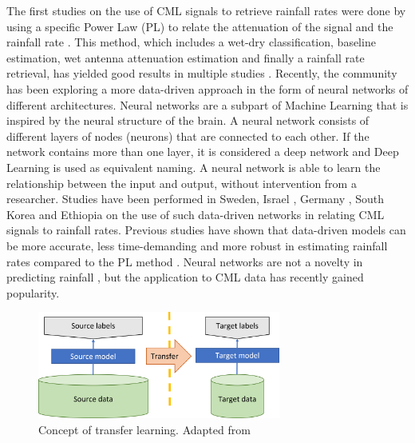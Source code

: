 \documentclass[twocolumn, 10pt, a4paper]{memoir}
\begin{document}
The first studies on the use of CML signals to retrieve rainfall rates were done by using a specific Power Law (PL) to relate the attenuation of the signal and the rainfall rate . This method, which includes a wet-dry classification, baseline estimation, wet antenna attenuation estimation and finally a rainfall rate retrieval, has yielded good results in multiple studies . Recently, the community has been exploring a more data-driven approach in the form of neural networks of different architectures. Neural networks are a subpart of Machine Learning that is inspired by the neural structure of the brain. A neural network consists of different layers of nodes (neurons) that are connected to each other. If the network contains more than one layer, it is considered a deep network and Deep Learning is used as equivalent naming. A neural network is able to learn the relationship between the input and output, without intervention from a researcher. Studies have been performed in Sweden, Israel , Germany , South Korea and Ethiopia \cite{Diba2021} on the use of such data-driven networks in relating CML signals to rainfall rates. Previous studies have shown that data-driven models can be more accurate, less time-demanding and more robust in estimating rainfall rates compared to the PL method . Neural networks are not a novelty in predicting rainfall , but the application to CML data has recently gained popularity.

\begin{figure}[t]
	\includegraphics[width=8cm]{Transfer_learning_concept}
	\caption{Concept of transfer learning. Adapted from \protect\cite{Sarkar2018} }
	\label{fig:transferconcept}
\end{figure} 
\end{document}
